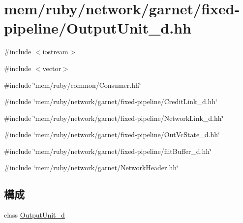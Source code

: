 \hypertarget{OutputUnit__d_8hh}{
\section{mem/ruby/network/garnet/fixed-\/pipeline/OutputUnit\_\-d.hh}
\label{OutputUnit__d_8hh}
}
{\ttfamily \#include $<$iostream$>$}\par
{\ttfamily \#include $<$vector$>$}\par
{\ttfamily \#include \char`\"{}mem/ruby/common/Consumer.hh\char`\"{}}\par
{\ttfamily \#include \char`\"{}mem/ruby/network/garnet/fixed-\/pipeline/CreditLink\_\-d.hh\char`\"{}}\par
{\ttfamily \#include \char`\"{}mem/ruby/network/garnet/fixed-\/pipeline/NetworkLink\_\-d.hh\char`\"{}}\par
{\ttfamily \#include \char`\"{}mem/ruby/network/garnet/fixed-\/pipeline/OutVcState\_\-d.hh\char`\"{}}\par
{\ttfamily \#include \char`\"{}mem/ruby/network/garnet/fixed-\/pipeline/flitBuffer\_\-d.hh\char`\"{}}\par
{\ttfamily \#include \char`\"{}mem/ruby/network/garnet/NetworkHeader.hh\char`\"{}}\par
\subsection*{構成}
\begin{DoxyCompactItemize}
\item 
class \hyperlink{classOutputUnit__d}{OutputUnit\_\-d}
\end{DoxyCompactItemize}
